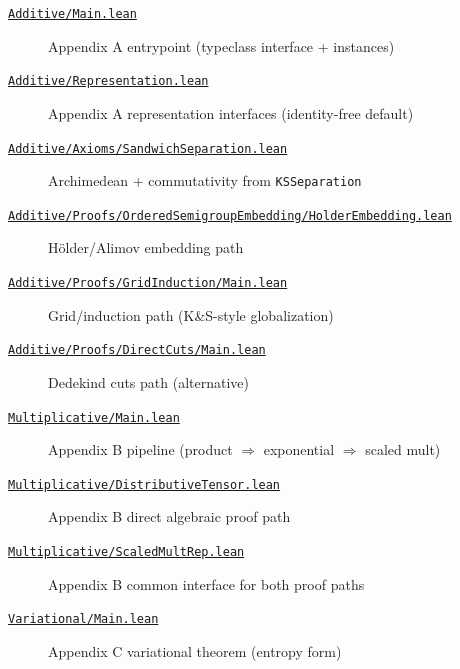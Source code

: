 \documentclass[11pt]{article}
\theoremstyle{definition}
\theoremstyle{remark}
\begin{document}
\begin{description}
\medskip
\item[\href{https://github.com/zariuq/ks-foundations-of-inference/blob/main/KnuthSkilling/Additive/Main.lean}{\texttt{Additive/Main.lean}}] Appendix A entrypoint (typeclass interface + instances)
\item[\href{https://github.com/zariuq/ks-foundations-of-inference/blob/main/KnuthSkilling/Additive/Representation.lean}{\texttt{Additive/Representation.lean}}] Appendix A representation interfaces (identity-free default)
\item[\href{https://github.com/zariuq/ks-foundations-of-inference/blob/main/KnuthSkilling/Additive/Axioms/SandwichSeparation.lean}{\texttt{Additive/Axioms/SandwichSeparation.lean}}] Archimedean + commutativity from \texttt{KSSeparation}
\item[\href{https://github.com/zariuq/ks-foundations-of-inference/blob/main/KnuthSkilling/Additive/Proofs/OrderedSemigroupEmbedding/HolderEmbedding.lean}{\texttt{Additive/Proofs/OrderedSemigroupEmbedding/HolderEmbedding.lean}}] Hölder/Alimov embedding path
\item[\href{https://github.com/zariuq/ks-foundations-of-inference/blob/main/KnuthSkilling/Additive/Proofs/GridInduction/Main.lean}{\texttt{Additive/Proofs/GridInduction/Main.lean}}] Grid/induction path (K\&S-style globalization)
\item[\href{https://github.com/zariuq/ks-foundations-of-inference/blob/main/KnuthSkilling/Additive/Proofs/DirectCuts/Main.lean}{\texttt{Additive/Proofs/DirectCuts/Main.lean}}] Dedekind cuts path (alternative)

\medskip
\item[\href{https://github.com/zariuq/ks-foundations-of-inference/blob/main/KnuthSkilling/Multiplicative/Main.lean}{\texttt{Multiplicative/Main.lean}}] Appendix B pipeline (product $\Rightarrow$ exponential $\Rightarrow$ scaled mult)
\item[\href{https://github.com/zariuq/ks-foundations-of-inference/blob/main/KnuthSkilling/Multiplicative/DistributiveTensor.lean}{\texttt{Multiplicative/DistributiveTensor.lean}}] Appendix B direct algebraic proof path
\item[\href{https://github.com/zariuq/ks-foundations-of-inference/blob/main/KnuthSkilling/Multiplicative/ScaledMultRep.lean}{\texttt{Multiplicative/ScaledMultRep.lean}}] Appendix B common interface for both proof paths

\medskip
\item[\href{https://github.com/zariuq/ks-foundations-of-inference/blob/main/KnuthSkilling/Variational/Main.lean}{\texttt{Variational/Main.lean}}] Appendix C variational theorem (entropy form)


\end{description}
\end{document}
